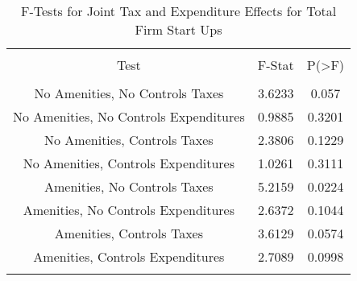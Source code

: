 
\begin{table}[!htbp] \centering 
  \caption{F-Tests for Joint Tax and Expenditure Effects for Total Firm Start Ups} 
  \label{--Ftests} 
\begin{tabular}{@{\extracolsep{5pt}} ccc} 
\\[-1.8ex]\hline 
\hline \\[-1.8ex] 
Test & F-Stat & P(\textgreater F) \\ 
\hline \\[-1.8ex] 
No Amenities, No Controls Taxes & 3.6233 & 0.057 \\ 
No Amenities, No Controls Expenditures & 0.9885 & 0.3201 \\ 
No Amenities, Controls Taxes & 2.3806 & 0.1229 \\ 
No Amenities, Controls Expenditures & 1.0261 & 0.3111 \\ 
Amenities, No Controls Taxes & 5.2159 & 0.0224 \\ 
Amenities, No Controls Expenditures & 2.6372 & 0.1044 \\ 
Amenities, Controls Taxes & 3.6129 & 0.0574 \\ 
Amenities, Controls Expenditures & 2.7089 & 0.0998 \\ 
\hline \\[-1.8ex] 
\end{tabular} 
\end{table} 
